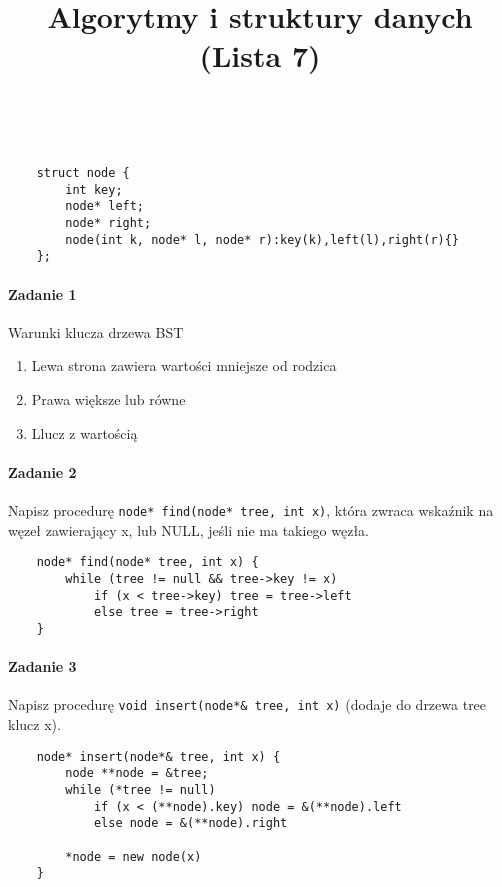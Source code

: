 \documentclass[18pt]{extarticle}
\begin{document}
\large
{}\selectfont

\title{Algorytmy i struktury danych (Lista 7)}
\date{}
\maketitle

 \\

\begin{lstlisting}
    struct node {
        int key;
        node* left;
        node* right;
        node(int k, node* l, node* r):key(k),left(l),right(r){}
    };
\end{lstlisting}
\paragraph{Zadanie 1} Warunki klucza drzewa BST
\begin{enumerate}
    \item Lewa strona zawiera wartości mniejsze od rodzica
    \item Prawa większe lub równe
    \item Llucz z wartością
\end{enumerate}

\paragraph{Zadanie 2} Napisz procedurę \verb|node* find(node* tree, int x)|, która zwraca wskaźnik na węzeł zawierający x, lub NULL, jeśli nie ma takiego węzła. \\

\begin{lstlisting}
    node* find(node* tree, int x) {
        while (tree != null && tree->key != x)
            if (x < tree->key) tree = tree->left
            else tree = tree->right
    }
\end{lstlisting}

\paragraph{Zadanie 3} Napisz procedurę \verb|void insert(node*& tree, int x)| (dodaje do drzewa tree klucz x). \\

\begin{lstlisting}
    node* insert(node*& tree, int x) {
        node **node = &tree;
        while (*tree != null)
            if (x < (**node).key) node = &(**node).left
            else node = &(**node).right

        *node = new node(x)
    }
\end{lstlisting}
\end{document}
